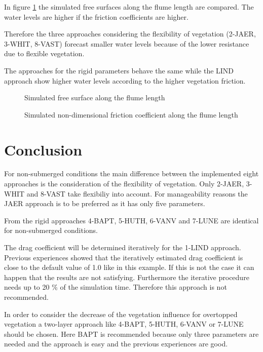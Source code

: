 In figure \ref{t2d:vegetation:free_surface} the simulated free surfaces along
the flume length are compared.
The water levels are higher if the friction coefficients are higher.

Therefore the three approaches considering the flexibility of vegetation
(2-JAER, 3-WHIT, 8-VAST) forecast smaller water levels because of the lower
resistance due to flexible vegetation. 

The approaches for the rigid parameters behave the same while the LIND approach
show higher water levels according to the higher vegetation friction.

\begin{figure}[h!]
\centering
{}
\caption{Simulated free surface along the flume length}
\label{t2d:vegetation:free_surface}
\end{figure}

\begin{figure}[h!]
\centering
{}
\caption{Simulated non-dimensional friction coefficient along the flume length}
\label{t2d:vegetation:cf}
\end{figure}



\section{Conclusion}
For non-submerged conditions the main difference between the implemented eight
approaches is the consideration of the flexibility of vegetation.
Only 2-JAER, 3-WHIT and 8-VAST take flexibiliy into account.
For manageability reasons the JAER approach is to be preferred as it has only
five parameters.
\newline

From the rigid approaches 4-BAPT, 5-HUTH, 6-VANV and 7-LUNE are identical for
non-submerged conditions. 

The drag coefficient will be determined iteratively for the 1-LIND approach.
Previous experiences showed that the iteratively estimated drag coefficient is
close to the default value of 1.0 like in this example. If this is not the case
it can happen that the results are not satisfying. Furthermore the iterative procedure
needs up to 20 \% of the simulation time. Therefore this approach is not recommended.
\newline

In order to consider the decrease of the vegetation influence for overtopped
vegetation a two-layer approach like 4-BAPT, 5-HUTH, 6-VANV or 7-LUNE should be chosen.
Here BAPT is recommended because only three parameters are needed and
the approach is easy and the previous experiences are good. 




